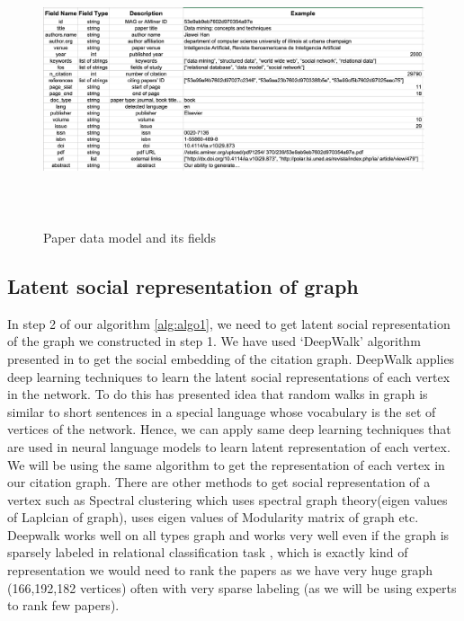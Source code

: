 \documentclass[a4paper, 11pt]{article}
\begin{document}
\begin{figure}[h]
    \centering
    \includegraphics[width=17cm,height=8cm]{datamodel_new}
    \caption{Paper data model and its fields \cite{data}}
    \label{fig:datamodel}
\end{figure}


\subsection{Latent social representation of graph}
In step 2 of our algorithm \ref{alg:algo1}, we need to get latent social representation of the graph we constructed in step 1. We have used `DeepWalk' algorithm presented in \cite{deepwalk} to get the social embedding of the citation graph. DeepWalk applies deep learning techniques to learn the latent social representations of each vertex in the network. To do this \cite{deepwalk} has presented idea that random walks in graph is similar to short sentences in a special language whose vocabulary is the set of vertices of the network. Hence, we can apply same deep learning techniques that are used in neural language models to learn latent representation of each vertex. We will be using the same algorithm to get the representation of each vertex in our citation graph. There are other methods to get social representation of a vertex such as Spectral clustering\cite{tang2011leveraging} which uses spectral graph theory(eigen values of Laplcian of graph), \cite{tang2009relational} uses eigen values of Modularity matrix of graph etc. Deepwalk works well on all types graph and works very well even if the graph is sparsely labeled in relational classification task \cite{deepwalk}, which is exactly kind of representation we would need to rank the papers as we have very huge graph (166,192,182 vertices) often with very sparse labeling (as we will be using experts to rank few papers). 
\end{document}
